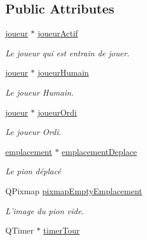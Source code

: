 \subsection*{Public Attributes}
\begin{DoxyCompactItemize}
\item 
\hyperlink{classjoueur}{joueur} $\ast$ \hyperlink{class_main_window_a70a2607d9b49f3b5cd32afec1cb614a9}{joueur\-Actif}
\begin{DoxyCompactList}\small\item\em Le joueur qui est entrain de jouer. \end{DoxyCompactList}\item 
\hyperlink{classjoueur}{joueur} $\ast$ \hyperlink{class_main_window_ac8503f9eb4259016c7858e59aa31c1a4}{joueur\-Humain}
\begin{DoxyCompactList}\small\item\em Le joueur Humain. \end{DoxyCompactList}\item 
\hyperlink{classjoueur}{joueur} $\ast$ \hyperlink{class_main_window_acb5c1aad1ac317404027da04e4a175d3}{joueur\-Ordi}
\begin{DoxyCompactList}\small\item\em Le joueur Ordi. \end{DoxyCompactList}\item 
\hypertarget{class_main_window_aa201a7ead9510f42427bd7b28e690df1}{\hyperlink{classemplacement}{emplacement} $\ast$ \hyperlink{class_main_window_aa201a7ead9510f42427bd7b28e690df1}{emplacement\-Deplace}}\label{class_main_window_aa201a7ead9510f42427bd7b28e690df1}

\begin{DoxyCompactList}\small\item\em Le pion déplacé \end{DoxyCompactList}\item 
\hypertarget{class_main_window_a40ca81795033b7d295527bc860f716cf}{Q\-Pixmap \hyperlink{class_main_window_a40ca81795033b7d295527bc860f716cf}{pixmap\-Empty\-Emplacement}}\label{class_main_window_a40ca81795033b7d295527bc860f716cf}

\begin{DoxyCompactList}\small\item\em L'image du pion vide. \end{DoxyCompactList}\item 
\hypertarget{class_main_window_abe41e7eada364f38acf9bfe58cc6eee3}{Q\-Timer $\ast$ \hyperlink{class_main_window_abe41e7eada364f38acf9bfe58cc6eee3}{timer\-Tour}}\label{class_main_window_abe41e7eada364f38acf9bfe58cc6eee3}


\end{DoxyCompactItemize}
